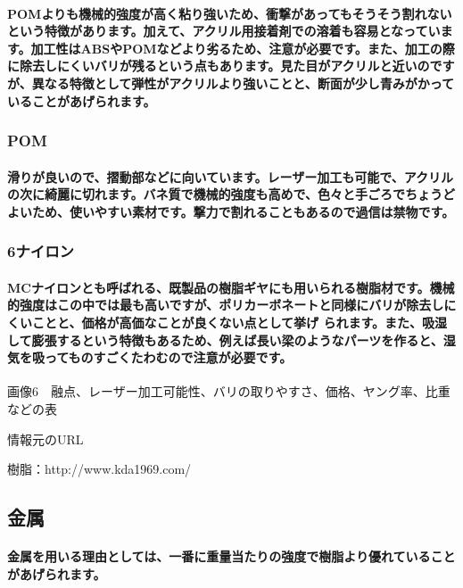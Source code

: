 \documentclass[b5paper, 9pt, twocolumn, titlepage,openany]{jsbook}%
\begin{document}
\paragraph{POMよりも機械的強度が高く粘り強いため、衝撃があってもそうそう割れないという特徴があります。加えて、アクリル用接着剤での溶着も容易となっています。加工性はABSやPOMなどより劣るため、注意が必要です。また、加工の際に除去しにくいバリが残るという点もあります。見た目がアクリルと近いのですが、異なる特徴として弾性がアクリルより強いことと、断面が少し青みがかっていることがあげられます。}

\subsubsection{POM}

\paragraph{滑りが良いので、摺動部などに向いています。レーザー加工も可能で、アクリルの次に綺麗に切れます。バネ質で機械的強度も高めで、色々と手ごろでちょうどよいため、使いやすい素材です。撃力で割れることもあるので過信は禁物です。}

\subsubsection{6ナイロン}

\paragraph{MCナイロンとも呼ばれる、既製品の樹脂ギヤにも用いられる樹脂材です。機械的強度はこの中では最も高いですが、ポリカーボネートと同様にバリが除去しにくいことと、価格が高価なことが良くない点として挙げ られます。また、吸湿して膨張するという特徴もあるため、例えば長い梁のようなパーツを作ると、湿気を吸ってものすごくたわむので注意が必要です。}

画像6　融点、レーザー加工可能性、バリの取りやすさ、価格、ヤング率、比重などの表

情報元のURL

樹脂：http://www.kda1969.com/

\subsection{金属}

\paragraph{金属を用いる理由としては、一番に重量当たりの強度で樹脂より優れていることがあげられます。}
\end{document}
